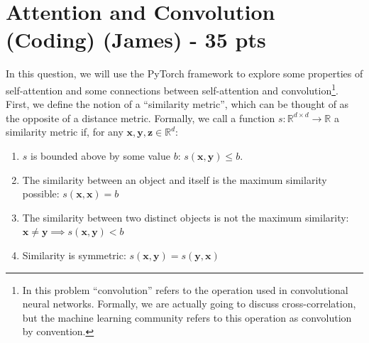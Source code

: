 \documentclass{exam}
\begin{document}
\section{Attention and Convolution (Coding) (James) - 35 pts}
In this question, we will use the PyTorch framework to explore some properties of self-attention and some connections between self-attention and convolution\footnote{In this problem ``convolution'' refers to the operation used in convolutional neural networks. Formally, we are actually going to discuss cross-correlation, but the machine learning community refers to this operation as convolution by convention.}. First, we define the notion of a ``similarity metric'', which can be thought of as the opposite of a distance metric. Formally, we call a function $s: \mathbb{R}^{d \times d} \to \mathbb{R}$ a similarity metric if, for any $\mathbf{x}, \mathbf{y}, \mathbf{z} \in \mathbb{R}^d$:
\begin{enumerate}
    \item $s$ is bounded above by some value $b$: $s(\mathbf{x}, \mathbf{y}) \leq b$.
    \item The similarity between an object and itself is the maximum similarity possible: $s(\mathbf{x}, \mathbf{x}) = b$
    \item The similarity between two distinct objects is not the maximum similarity: $\mathbf{x} \neq \mathbf{y} \implies s(\mathbf{x}, \mathbf{y}) < b$
    \item Similarity is symmetric: $s(\mathbf{x}, \mathbf{y}) = s(\mathbf{y}, \mathbf{x})$
\end{enumerate}
\end{document}
